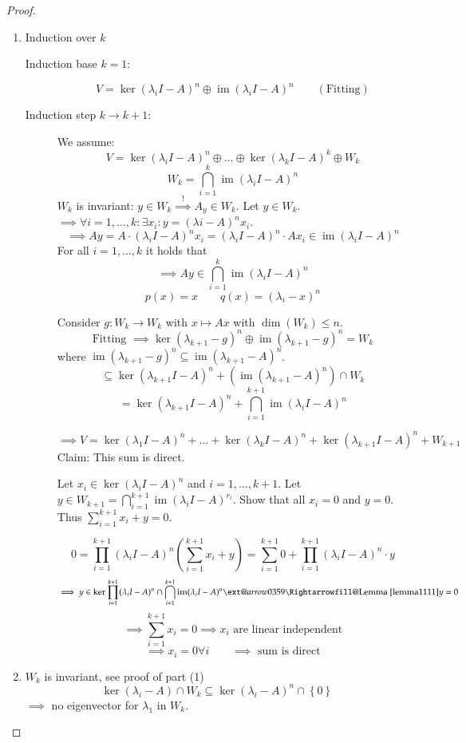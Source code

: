 \documentclass[a4paper]{article}
\makeatletter
\numberwithin{lecref}{section}
\newcommand{\set}[1]{\left\{#1\right\}}
\newcommand{\xRightarrow}[2][]{\ext@arrow 0359\Rightarrowfill@{#1}{#2}}
\DeclareMathOperator{\im}{im}
\makeatother
\begin{document}
\begin{proof}
  \begin{enumerate}
    \item Induction over $k$
      \begin{description}
        \item[Induction base $k=1$:] 
          \[ V = \ker(\lambda_i I - A)^n \oplus \im(\lambda_i I - A)^n \qquad (\text{Fitting}) \]
        \item[Induction step $k \to k+1$:]
          We assume:
          \[ V = \ker(\lambda_i I - A)^n \oplus \dots \oplus \ker(\lambda_k I - A)^k \oplus W_k \]
          \[ W_k = \bigcap_{i=1}^k \im(\lambda_i I - A)^n \]
          $W_k$ is invariant: $y \in W_k \overset!\implies A_y \in W_k$.
          Let $y \in W_k$. $\implies \forall i = 1, \dots, k: \exists x_i: y = (\lambda i - A)^n x_i$.
          \[ \implies Ay = A \cdot (\lambda_i I - A)^n x_i = (\lambda_i I - A)^n \cdot Ax_i \in \im(\lambda_i I - A)^n \]
          For all $i = 1,\dots,k$ it holds that
          \[ \implies Ay \in \bigcap_{i=1}^k \im(\lambda_i I - A)^n \]
          \[ p(x) = x \qquad q(x) = (\lambda_i - x)^n \]

          Consider $g: W_k \to W_k$ with $x \mapsto Ax$ with $\dim(W_k) \leq n$.
          \[ \text{Fitting } \implies \ker(\lambda_{k+1} - g)^n \oplus \im(\lambda_{k+1} - g)^n = W_k \]
          where $\im(\lambda_{k+1} - g)^n \subseteq \im(\lambda_{k+1} - A)^n$.
          \[ \subseteq \ker(\lambda_{k+1} I - A)^n + (\im(\lambda_{k+1} - A)^n) \cap W_k \]
          \[ = \ker(\lambda_{k+1} I - A)^n + \bigcap_{i=1}^{k+1} \im(\lambda_i I - A)^n \]

          \[ \implies V = \ker(\lambda_1 I - A)^n + \dots + \ker(\lambda_k I - A)^n + \ker(\lambda_{k+1} I - A)^n + W_{k+1} \]
          Claim: This sum is direct.

          Let $x_i \in \ker(\lambda_i I - A)^n$ and $i=1,\dots,k+1$.
          Let $y \in W_{k+1} = \bigcap_{i=1}^{k+1} \im(\lambda_i I - A)^{r_i}$.
          Show that all $x_i = 0$ and $y = 0$. Thus $\sum_{i=1}^{k+1} x_i + y = 0$.

          \[ 0 = \prod_{i=1}^{k+1} (\lambda_i I - A)^n \left(\sum_{i=1}^{k+1} x_i + y\right) = \sum_{i=1}^{k+1} 0 + \prod_{i=1}^{k+1} (\lambda_i I - A)^n \cdot y \]
          \[ \implies y \in \ker{\prod_{i=1}^{k+1} (\lambda_i I - A)^n \cap \bigcap_{i=1}^{k+1} \im(\lambda_i I - A)^n} \xRightarrow{\text{Lemma~\ref{lemma1111}}} y = 0 \]
          \[ \implies \sum_{i=1}^{k+1} x_i = 0 \implies x_i \text{ are linear independent} \]
          \[ \implies x_i = 0 \forall i \qquad \implies \text{ sum is direct} \]
      \end{description}
    \item
      $W_k$ is invariant, see proof of part (1)
      \[ \ker(\lambda_i - A) \cap W_k \subseteq \ker(\lambda_i - A)^n \cap \set{0} \]
      $\implies$ no eigenvector for $\lambda_1$ in $W_k$.
  \end{enumerate}
\end{proof}
\end{document}
